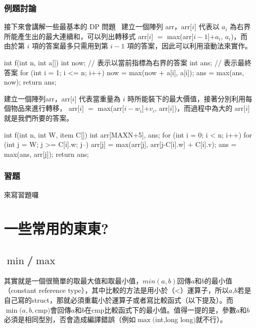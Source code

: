 \subsection{例題討論} 
接下來會講解一些最基本的 DP 問題~
建立一個陣列 arr，arr[$i$] 代表以 $a_i$ 為右界所能產生出的最大連續和，可以列出轉移式 arr[$i$] $=$ max(arr[$i-1$]$+ a_i$, $a_i$)，而由於第 $i$ 項的答案最多只需用到第 $i-1$ 項的答案，因此可以利用滾動法來實作。
\begin{C++}
	int f(int n, int a[]) {
		int now; // 表示以當前指標為右界的答案
		int ans; // 表示最終答案
		for (int i = 1; i <= n; i++) {
			now = max(now + a[i], a[i]);
			ans = max(ans, now);
		}
		return ans;
	}
\end{C++}

建立一個陣列arr，arr[$i$] 代表當重量為 $i$ 時所能裝下的最大價值，接著分別利用每個物品來進行轉移，  arr[$i$] $=$ max(arr[$i-w_i$]$+ v_i$, arr[$i$])，而過程中為大的 arr[$i$] 就是我們所要的答案。
\begin{C++}
	int f(int n, int W, item C[]) {
		int arr[MAXN+5], ans;
		for (int i = 0; i < n; i++) {
			for (int j = W; j >= C[i].w; j--) {
				arr[j] = max(arr[j], arr[j-C[i].w] + C[i].v);
				ans = max(ans, arr[j]);
			}
		}
		return ans;
	}
\end{C++}
\subsection{習題} 
來寫習題囉

\chapter{一些常用的東東?}
\section{$\min$/$\max$}
其實就是一個很簡單的取最大值和取最小值，$min(a,b)$回傳$a$和$b$的最小值（constant reference type），其中比較的方法是用小於（<）運算子，所以$a$,$b$若是自己寫的struct，那就必須重載小於運算子或者寫比較函式（以下提及）。而$\min(a,b,$cmp$)$會回傳$a$和$b$在cmp比較函式下的最小值。值得一提的是，參數$a$和$b$必須是相同型別，否會造成編譯錯誤（例如$\max($int,long long$)$就不行）。
